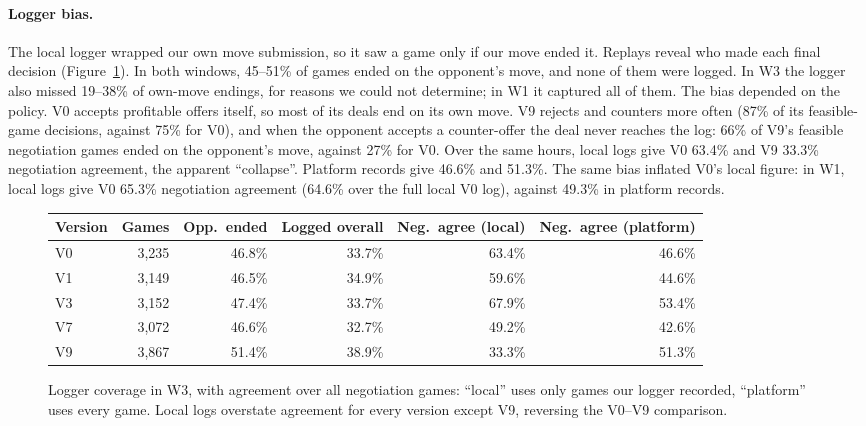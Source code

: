 \documentclass{article}
\begin{document}
\paragraph{Logger bias.}
The local logger wrapped our own move submission, so it saw a game only if our move ended it. Replays reveal who made each final decision (Figure~\ref{fig:coverage}). In both windows, 45--51\% of games ended on the opponent's move, and none of them were logged. In W3 the logger also missed 19--38\% of own-move endings, for reasons we could not determine; in W1 it captured all of them. The bias depended on the policy. V0 accepts profitable offers itself, so most of its deals end on its own move. V9 rejects and counters more often (87\% of its feasible-game decisions, against 75\% for V0), and when the opponent accepts a counter-offer the deal never reaches the log: 66\% of V9's feasible negotiation games ended on the opponent's move, against 27\% for V0. Over the same hours, local logs give V0 63.4\% and V9 33.3\% negotiation agreement, the apparent ``collapse''. Platform records give 46.6\% and 51.3\%. The same bias inflated V0's local figure: in W1, local logs give V0 65.3\% negotiation agreement (64.6\% over the full local V0 log), against 49.3\% in platform records.

\begin{figure}[!t]
\centering
\small
\begin{tabular}{lrrrrr}
\toprule
Version & Games & Opp.\ ended & Logged overall & Neg.\ agree (local) & Neg.\ agree (platform) \\
\midrule
V0 & 3{,}235 & 46.8\% & 33.7\% & 63.4\% & 46.6\% \\
V1 & 3{,}149 & 46.5\% & 34.9\% & 59.6\% & 44.6\% \\
V3 & 3{,}152 & 47.4\% & 33.7\% & 67.9\% & 53.4\% \\
V7 & 3{,}072 & 46.6\% & 32.7\% & 49.2\% & 42.6\% \\
V9 & 3{,}867 & 51.4\% & 38.9\% & 33.3\% & 51.3\% \\
\bottomrule
\end{tabular}
\caption{Logger coverage in W3, with agreement over all negotiation games: ``local'' uses only games our logger recorded, ``platform'' uses every game. Local logs overstate agreement for every version except V9, reversing the V0--V9 comparison.}
\label{fig:coverage}
\end{figure}
\end{document}
